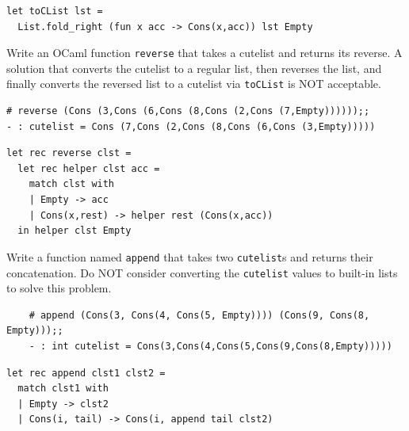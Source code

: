 \documentclass[addpoints]{exam}
\begin{document}
\begin{questions}
  \begin{solutionbox}{2cm}
    \begin{verbatim}
let toCList lst =
  List.fold_right (fun x acc -> Cons(x,acc)) lst Empty
    \end{verbatim}
  \end{solutionbox}


  \question
  Write an OCaml function \texttt{reverse} that takes a cutelist and 
  returns its reverse.
  A solution that converts the cutelist to a regular list,
  then reverses the list, and finally converts the reversed
  list to a cutelist via \texttt{toCList}
  is NOT acceptable.
  \begin{verbatim}
# reverse (Cons (3,Cons (6,Cons (8,Cons (2,Cons (7,Empty))))));;
- : cutelist = Cons (7,Cons (2,Cons (8,Cons (6,Cons (3,Empty)))))
  \end{verbatim}

  \begin{solutionbox}{4cm}
    \begin{verbatim}
let rec reverse clst =
  let rec helper clst acc =
    match clst with
    | Empty -> acc
    | Cons(x,rest) -> helper rest (Cons(x,acc))
  in helper clst Empty
    \end{verbatim}
  \end{solutionbox}

  
  \question
  Write a function named \texttt{append} that takes
  two \texttt{cutelist}s and returns their concatenation.
  Do NOT consider converting the \texttt{cutelist} values to
  built-in lists to solve this problem.
  
  \begin{verbatim}
    # append (Cons(3, Cons(4, Cons(5, Empty)))) (Cons(9, Cons(8, Empty)));;
    - : int cutelist = Cons(3,Cons(4,Cons(5,Cons(9,Cons(8,Empty)))))
  \end{verbatim}

  \begin{solutionbox}{3cm}
    \begin{verbatim}
let rec append clst1 clst2 =
  match clst1 with
  | Empty -> clst2
  | Cons(i, tail) -> Cons(i, append tail clst2)
    \end{verbatim}
  \end{solutionbox}

    
\end{questions}
\end{document}
